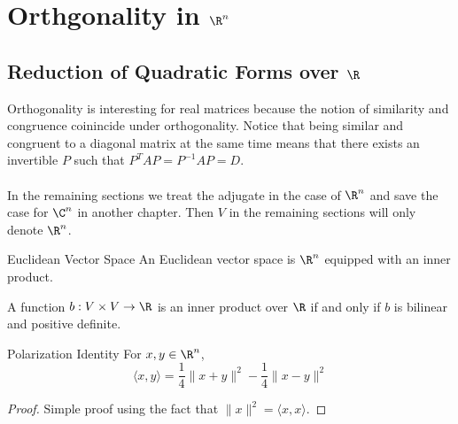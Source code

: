 \pagebreak
\section{Orthgonality in $\R^n$}
\subsection{Reduction of Quadratic Forms over $\R$}
Orthogonality is interesting for real matrices because the notion of similarity and congruence coinincide under orthogonality. Notice that being similar and congruent to a diagonal matrix at the same time means that there exists an invertible $P$ such that $P^TAP=P^{-1}AP=D$. \\~\\

In the remaining sections we treat the adjugate in the case of $\R^n$ and save the case for $\C^n$ in another chapter. Then $V$ in the remaining sections will only denote $\R^n$. 

\begin{defn}{Euclidean Vector Space}{} An Euclidean vector space is $\R^n$ equipped with an inner product. 
\end{defn}

\begin{prp}{}{} A function $b:V\times V\to\R$ is an inner product over $\R$ if and only if $b$ is bilinear and positive definite. 
\end{prp}

\begin{lmm}{Polarization Identity}{} For $x,y\in\R^n$, $$\langle x,y\rangle=\frac{1}{4}\|x+y\|^2-\frac{1}{4}\|x-y\|^2$$\tcbline
\begin{proof} Simple proof using the fact that $\|x\|^2=\langle x,x\rangle$. 
\end{proof}
\end{lmm}

